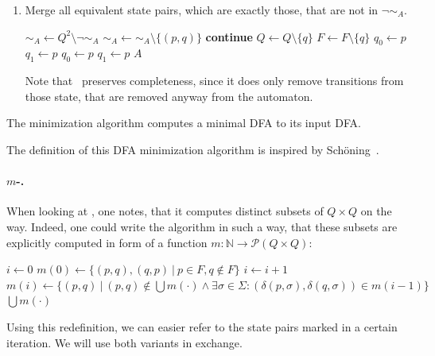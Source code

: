 \begin{enumerate}
	\item Merge all equivalent state pairs, which are exactly those, that are not in $\neg \sim_A$.
	
	\vspace{0.2cm}
	\begin{algorithmic}[1] \label{ch:1:minmerge}
			\State $\sim_A \gets Q^2 \setminus \neg \sim_A$
				\State $\sim_A \gets \sim_A \setminus \{ (p,q) \}$
					\State \textbf{continue}
				\EndIf
				\State
				\State $Q \gets Q \setminus \{q\}$
					\State $F \gets F \setminus \{q\}$
				\EndIf
						\State $q_0 \gets p$
					\EndIf
						\State $q_1 \gets p$
					\EndIf
				\EndFor
				\State
						\State $q_0 \gets p$
					\EndIf
						\State $q_1 \gets p$
					\EndIf
				\EndFor
			\EndWhile
			\State \Return $A$
		\EndFunction
	\end{algorithmic}
	Note that \RemEq\ preserves completeness, since it does only remove transitions from those state, that are removed anyway from the automaton.
\end{enumerate}
\begin{theorem}
	The minimization algorithm computes a minimal DFA to its input DFA.
\end{theorem}
\noindent The definition of this DFA minimization algorithm is inspired by Schöning~\cite[p. 46]{schoening01}.

\paragraph*{$m$-\CompDist.}

When looking at \CompDist, one notes, that it computes distinct subsets of $Q \times Q$ on the way. Indeed, one could write the algorithm in such a way, that these subsets are explicitly computed in form of a function $m\colon\mathbb{N}\to\mathcal{P}(Q\times Q)$:
\vspace{0.2cm}
\begin{algorithmic}[1] \label{ch:1:m-minmark}
	\State $i \gets 0$
	\State $m(0) \gets \{ (p,q), (q,p)\ |\ p \in F, q \notin F \}$
	\Do
		\State $i \gets i + 1$
		\State $m(i) \gets \{ (p,q)\ |\ (p,q) \notin \bigcup{m(\cdot)} \land \exists \sigma \in \Sigma \colon (\delta(p,\sigma), \delta(q,\sigma)) \in m(i-1) \}$
	\State \Return $\bigcup{m(\cdot)}$
	\EndFunction
\end{algorithmic}
\vspace{0.2cm}
Using this redefinition, we can easier refer to the state pairs marked in a certain iteration. We will use both variants in exchange.

